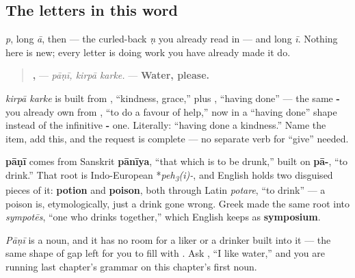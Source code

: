 \subsection*{The letters in this word}
\textbf{} \emph{p}, \textbf{} long \emph{ā}, then \textbf{} — the curled-back \emph{ṇ} you already read in \textbf{} — and \textbf{} long \emph{ī}. Nothing here is new; every letter is doing work you have already made it do.

\begin{grammarlens}[title={Grammar Lens: asking politely}]
\begin{quote}
\textbf{,  } — \emph{pāṇī, kirpā karke.} — \textbf{Water, please.}
\end{quote}

\textbf{ } \emph{kirpā karke} is built from \textbf{}, \textquotedblleft{}kindness, grace,\textquotedblright{} plus \textbf{}, \textquotedblleft{}having done\textquotedblright{} — the same \textbf{-} you already own from \textbf{ }, \textquotedblleft{}to do a favour of help,\textquotedblright{} now in a \textquotedblleft{}having done\textquotedblright{} shape instead of the infinitive \textbf{-} one. Literally: \textquotedblleft{}having done a kindness.\textquotedblright{} Name the item, add this, and the request is complete — no separate verb for \textquotedblleft{}give\textquotedblright{} needed.
\end{grammarlens}

\begin{cousinweb}
\textbf{pāṇī} comes from Sanskrit \textbf{pānīya}, \textquotedblleft{}that which is to be drunk,\textquotedblright{} built on \textbf{pā-}, \textquotedblleft{}to drink.\textquotedblright{} That root is Indo-European *\emph{peh\textsubscript{3}(i)-}, and English holds two disguised pieces of it: \textbf{potion} and \textbf{poison}, both through Latin \emph{potare}, \textquotedblleft{}to drink\textquotedblright{} — a poison is, etymologically, just a drink gone wrong. Greek made the same root into \emph{sympotēs}, \textquotedblleft{}one who drinks together,\textquotedblright{} which English keeps as \textbf{symposium}.

\emph{Pāṇī} is a noun, and it has no room for a liker or a drinker built into it — the same shape of gap \textbf{} left for you to fill with \textbf{}. Ask \textbf{   }, \textquotedblleft{}I like water,\textquotedblright{} and you are running last chapter's grammar on this chapter's first noun.
\end{cousinweb}

